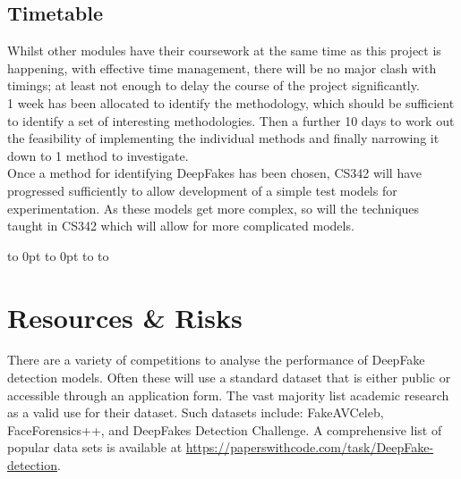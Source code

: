 \documentclass{article}
\begin{document}
\newpage
\thispagestyle{empty}
\def\fillandplacepagenumber{
 \par\pagestyle{empty}
 \vbox to 0pt{\vss}\vfill
 \vbox to 0pt{\baselineskip0pt
   \hbox to\linewidth{\hss}
   \baselineskip\footskip
   \hbox to\linewidth{
     \hfil\thepage\hfil}\vss}}
\begin{landscape}
\section{Timetable}
\begin{center}
    \resizebox{1.5\textwidth}{!}{}
\end{center}

\noindent
Whilst other modules have their coursework at the same time as this project is happening, with effective time management, there will be no major clash with timings; at least not enough to delay the course of the project significantly.\\

1 week has been allocated to identify the methodology, which should be sufficient to identify a set of interesting methodologies. Then a further 10 days to work out the feasibility of implementing the individual methods and finally narrowing it down to 1 method to investigate.\\

Once a method for identifying DeepFakes has been chosen, CS342 will have progressed sufficiently to allow development of a simple test models for experimentation. As these models get more complex, so will the techniques taught in CS342 which will allow for more complicated models.\\

\fillandplacepagenumber
\end{landscape}

\section{Resources \& Risks}
There are a variety of competitions to analyse the performance of DeepFake detection models. Often these will use a standard dataset that is either public or accessible through an application form. The vast majority list academic research as a valid use for their dataset. Such datasets include: FakeAVCeleb\cite{deepfake-detection-challenge}, FaceForensics++\cite{roessler2019faceforensicspp}, and DeepFakes Detection Challenge\cite{DDD_GoogleJigSaw2019}. A comprehensive list of popular data sets is available at \url{https://paperswithcode.com/task/DeepFake-detection}.\\
\end{document}
